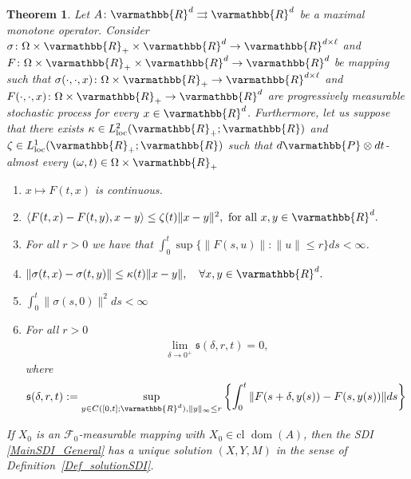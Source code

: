 \documentclass[11pt,reqno]{article}
\let\mathbb=\varmathbb
\newcommand{\R}{\mathbb{R}}
\newcommand{\cl}{{\text{cl }}}
\newcommand{\1}{\mathds{1}}
\numberwithin{equation}{section}  %
\theoremstyle{plain}
\newtheorem{theorem}{Theorem}
\theoremstyle{definition}
\theoremstyle{remark}
\numberwithin{theorem}{section}
\numberwithin{remark}{section}
\numberwithin{example}{section}
\begin{document}
\begin{theorem}\label{Theo:EU}
 Let $A \colon \mathbb{R}^d \rightrightarrows \mathbb{R}^d$ be   a maximal monotone operator. Consider $\sigma \colon \Omega \times  \R_+ \times \mathbb{R}^d \to \mathbb{R}^{d\times \ell}$ and $F\colon  \Omega \times \R_+ \times \R^d \to \R^d$  be   mapping such that $\sigma (\cdot, \cdot,  x)\colon \Omega \times \R_+   \to \mathbb{R}^{d\times \ell}$ and $F(\cdot,\cdot, x) \colon  \Omega \times \R_+ \to \R^d $ are   progressively measurable stochastic process for every $x\in \mathbb{R}^d$. Furthermore, let us suppose that there exists $\kappa \in L^2_{\mathrm{loc}}(\R_+; \R)$  and $\zeta \in L^1_{\mathrm{loc}} (\R_+; \mathbb{R})$ such that  $d\mathbb{P}\otimes dt$-almost every $(\omega,t)\in \Omega \times \mathbb{R}_+$
\begin{enumerate}[label=\alph*)]  
   \item $x \mapsto F(t,x) $ is continuous. 
   \item  $  
        \langle F(t,x) - F(t,y) , x - y \rangle \leq \zeta(t) \| x - y\|^2, \text{ for all } x,y\in \R^d.
        $ 
        \item   For all $r  >0$ we have that $\int_0^t \sup\{ \| F(s,u)\| :\|u\| \leq r\} ds < \infty$.  
        \item  $  
           \|\sigma(  t,x)-\sigma( t,y)\| \leq \kappa(t)\|x-y\|, \quad \forall x,y\in\mathbb{R}^d.
        $  
         \item $\int_0^t \|\sigma (s,0)\|^2 ds<\infty$
       \item For all $r>0$ 
        \begin{align*}
        \lim_{ \delta \to 0^+}\mathfrak{s}(\delta, r,t) =0,  
        \end{align*}
        where $$\mathfrak{s}(\delta,r,t):= \sup\limits_{y \in C([0,t];\R^d), \| y\|_\infty \leq r} \left\{  \int_0^t \| F(s + \delta, y(s) ) - F(s,y(s)) \| ds \right\}$$
       

       
      
\end{enumerate}
 

If $X_0 $ is an $\mathcal{F}_0$-measurable mapping with $X_0 \in  \cl\operatorname{dom}(A)$, then the SDI \eqref{MainSDI_General} has a unique solution $(X,Y,M)$ in the sense of Definition~\ref{Def_solutionSDI}. 
\end{theorem}
\end{document}
